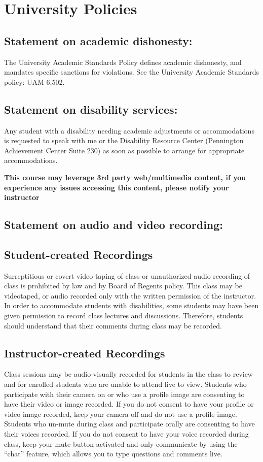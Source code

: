 \documentclass[11pt, a4paper]{article}
\begin{document}
\section*{University Policies}

\subsection*{Statement on academic dishonesty:}
The University Academic Standards Policy defines academic dishonesty,
and mandates specific sanctions for violations. See the University
Academic Standards policy: UAM 6,502.

\subsection*{Statement on disability services:}
Any student with a disability needing academic adjustments or
accommodations is requested to speak with me or the Disability
Resource Center (Pennington Achievement Center Suite 230) as soon as
possible to arrange for appropriate accommodations.

\textbf{This course may leverage 3rd party web/multimedia content, if
  you experience any issues accessing this content, please notify your
  instructor}

\subsection*{Statement on audio and video recording:}
\subsection*{Student-created Recordings}
Surreptitious or covert video-taping of class or unauthorized audio recording of class is prohibited by law and by Board of Regents policy. This class may be videotaped, or audio recorded only with the written permission of the instructor. In order to accommodate students with disabilities, some students may have been given permission to record class lectures and discussions. Therefore, students should understand that their comments during class may be recorded.

\subsection*{Instructor-created Recordings}
Class sessions may be audio-visually recorded for students in the class to review and for enrolled students who are unable to attend live to view. Students who participate with their camera on or who use a profile image are consenting to have their video or image recorded. If you do not consent to have your profile or video image recorded, keep your camera off and do not use a profile image. Students who un-mute during class and participate orally are consenting to have their voices recorded. If you do not consent to have your voice recorded during class, keep your mute button activated and only communicate by using the ``chat'' feature, which allows you to type questions and comments live.
\end{document}
